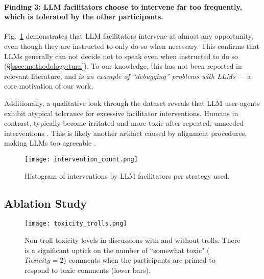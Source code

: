\paragraph{Finding 3: LLM facilitators choose to intervene far too frequently, which is tolerated by the other participants.} Fig.~\ref{fig:intervention_count} demonstrates that LLM facilitators intervene at almost any opportunity, even though they are instructed to only do so when necessary. This confirms that LLMs generally can not decide not to speak even when instructed to do so  (\S\ref{ssec:methodology:turn}). To our knowledge, this has not been reported in relevant literature, and \emph{is an example of ``debugging'' problems with LLMs} --- a core motivation of our work.

Additionally, a qualitative look through the dataset reveals that LLM user-agents exhibit atypical tolerance for excessive facilitator interventions. Humans in contrast, typically become irritated and more toxic after repeated, unneeded interventions \citep{schaffner_community_guidelines, make_reddit_great, proactive_moderation, cresci_pesonalized_interventions}. This is likely another artifact caused by alignment procedures, making LLMs too agreeable \citep{park2023game, anthis_2025}.

\begin{figure}[t]
	\centering
	\texttt{[image: intervention\_count.png]}
	\caption{Histogram of interventions by LLM facilitators per strategy used.}
	\label{fig:intervention_count}
\end{figure}


\subsection{Ablation Study}
\label{ssec:results:ablation}

\begin{figure}[t]
	\centering
	\texttt{[image: toxicity\_trolls.png]}
	\caption{Non-troll toxicity levels in discussions with and without trolls. There is a significant uptick on the number of ``somewhat toxic" ($Toxicity=2$) comments when the participants are primed to respond to toxic comments (lower bars).}
	\label{fig:toxicity_trolls}
\end{figure}


